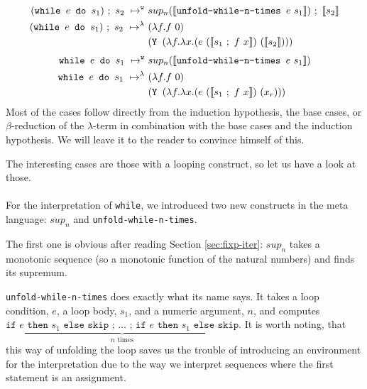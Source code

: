 \documentclass[11pt, leqno, titlepage]{article}
\theoremstyle{definition}
\begin{document}
\begin{align}
  (\texttt{while } e \texttt{ do } s_1) ~;~ s_2
  ~\mapsto^{\texttt{w}}~ & sup_n(\llbracket \texttt{unfold-while-n-times }e~s_1
                \rrbracket) ~;~\llbracket s_2\rrbracket \label{eq:while-sec-both}\\
  (\texttt{while } e \texttt{ do } s_1) ~;~ s_2
  ~\mapsto^\lambda~ & (\lambda f. f~0)\notag\\
                         &(\texttt{Y }(\lambda f.\lambda x.(e~(\llbracket
                           s_1~;~f~x\rrbracket) ~(\llbracket s_2\rrbracket )))\notag
\end{align}
\begin{align}
  \texttt{while } e \texttt{ do } s_1
  ~\mapsto^{\texttt{w}}~ & sup_n(\llbracket \texttt{unfold-while-n-times }e~s_1
                           \rrbracket)\label{eq:while-both} \\
  \texttt{while } e \texttt{ do } s_1
  ~\mapsto^\lambda~ & (\lambda f. f~0)\notag\\
                         &(\texttt{Y }(\lambda f.\lambda x.(e~(\llbracket
                           s_1~;~f~x\rrbracket) ~(x_r)))\notag
\end{align}
Most of the cases follow directly from the induction hypothesis, the base cases, or
$\beta$-reduction of the $\lambda$-term in combination with the base cases and the
induction hypothesis. We will leave it to the reader to convince himself of this.

The interesting cases are those with a looping construct, so let us have a look at
those.\\
\\
For the interpretation of \texttt{while}, we introduced two new constructs in the
meta language: $sup_n$ and \texttt{unfold-while-n-times}.

The first one is obvious after reading Section \ref{sec:fixp-iter}: $sup_n$ takes a
monotonic sequence (so a monotonic function of the natural numbers) and finds its
supremum.

\texttt{unfold-while-n-times} does exactly what its name says. It takes a loop
condition, $e$, a loop body, $s_1$, and a numeric argument, $n$, and computes
$\underbrace{\texttt{if $e$ then $s_1$ else skip ; $\dots$ ; if $e$ then $s_1$ else
    skip}}_{n\text{ times}}$. It is worth noting, that this way of unfolding the loop
saves us the trouble of introducing an environment for the interpretation due to the
way we interpret sequences where the first statement is an assignment. 
\end{document}
